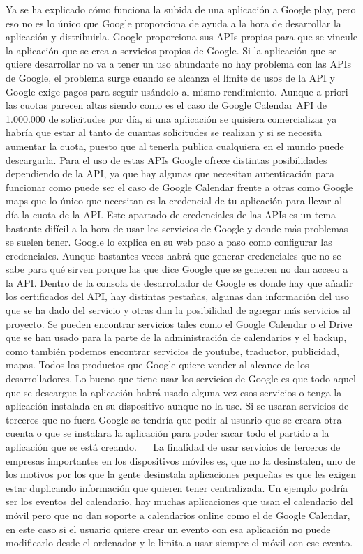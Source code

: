 Ya se ha explicado cómo funciona la subida de una aplicación a Google play, pero eso no es lo único que Google proporciona de ayuda a la hora de desarrollar la aplicación y distribuirla.
Google proporciona sus APIs propias para que se vincule la aplicación que se crea a servicios propios de Google. Si la aplicación que se quiere desarrollar no va a tener un uso abundante no hay problema con las APIs de Google, el problema surge cuando se alcanza el límite de usos de la API y Google exige pagos para seguir usándolo al mismo rendimiento.
Aunque a priori las cuotas parecen altas siendo como es el caso de Google Calendar API de 1.000.000 de solicitudes por día, si una aplicación se quisiera comercializar ya habría que estar al tanto de cuantas solicitudes se realizan y si se necesita aumentar la cuota, puesto que al tenerla publica cualquiera en el mundo puede descargarla.
Para el uso de estas APIs Google ofrece distintas posibilidades dependiendo de la API, ya que hay algunas que necesitan autenticación para funcionar como puede ser el caso de Google Calendar frente a otras como Google maps que lo único que necesitan es la credencial de tu aplicación para llevar al día la cuota de la API.
Este apartado de credenciales de las APIs es un tema bastante difícil a la hora de usar los servicios de Google y donde más problemas se suelen tener. Google lo explica en su web paso a paso como configurar las credenciales. Aunque bastantes veces habrá que generar credenciales que no se sabe para qué sirven porque las que dice Google que se generen no dan acceso a la API.
Dentro de la consola de desarrollador de Google es donde hay que añadir los certificados del API, hay distintas pestañas, algunas dan información del uso que se ha dado del servicio y otras dan la posibilidad de agregar más servicios al proyecto.
Se pueden encontrar servicios tales como el Google Calendar o el Drive que se han usado para la parte de la administración de calendarios y el backup, como también podemos encontrar servicios de youtube, traductor, publicidad, mapas. Todos los productos que Google quiere vender al alcance de los desarrolladores.
Lo bueno que tiene usar los servicios de Google es que todo aquel que se descargue la aplicación habrá usado alguna vez esos servicios o tenga la aplicación instalada en su dispositivo aunque no la use. Si se usaran servicios de terceros que no fuera Google se tendría que pedir al usuario que se creara otra cuenta o que se instalara la aplicación para poder sacar todo el partido a la aplicación que se está creando.
 
La finalidad de usar servicios de terceros de empresas importantes en los dispositivos móviles es, que no la desinstalen, uno de los motivos por los que la gente desinstala aplicaciones pequeñas es que les exigen estar duplicando información que quieren tener centralizada. Un ejemplo podría ser los eventos del calendario, hay muchas aplicaciones que usan el calendario del móvil pero que no dan soporte a calendarios online como el de Google Calendar, en este caso si el usuario quiere crear un evento con esa aplicación no puede modificarlo desde el ordenador y le limita a usar siempre el móvil con ese evento.
